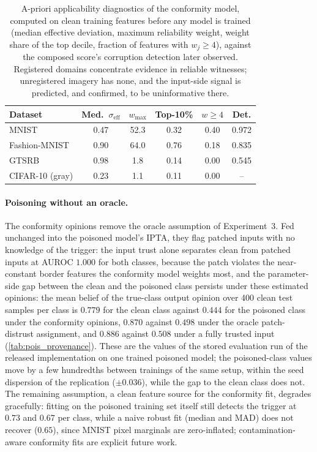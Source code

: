 \begin{table}[ht]
\centering
\begin{tabular}{lccccc}
\hline
Dataset & Med.\ $\sigma_{\mathrm{eff}}$ & $w_{\max}$ & Top-10\% & $w{\geq}4$ & Det. \\
\hline
MNIST & 0.47 & 52.3 & 0.32 & 0.40 & 0.972 \\
Fashion-MNIST & 0.90 & 64.0 & 0.76 & 0.18 & 0.835 \\
GTSRB & 0.98 & 1.8 & 0.14 & 0.00 & 0.545 \\
CIFAR-10 (gray) & 0.23 & 1.1 & 0.11 & 0.00 & -- \\
\hline
\end{tabular}
\caption{A-priori applicability diagnostics of the conformity model, computed on clean training features before any model is trained (median effective deviation, maximum reliability weight, weight share of the top decile, fraction of features with $w_j \geq 4$), against the composed score's corruption detection later observed. Registered domains concentrate evidence in reliable witnesses; unregistered imagery has none, and the input-side signal is predicted, and confirmed, to be uninformative there.}
\label{tab:diss-diagnostics}
\end{table}

\paragraph*{Poisoning without an oracle.}
The conformity opinions remove the oracle assumption of Experiment~3. Fed unchanged into the poisoned model's \ac{IPTA}, they flag patched inputs with no knowledge of the trigger: the input trust alone separates clean from patched inputs at AUROC $1.000$ for both classes, because the patch violates the near-constant border features the conformity model weights most, and the parameter-side gap between the clean and the poisoned class persists under these estimated opinions: the mean belief of the true-class output opinion over 400 clean test samples per class is $0.779$ for the clean class against $0.444$ for the poisoned class under the conformity opinions, $0.870$ against $0.498$ under the oracle patch-distrust assignment, and $0.886$ against $0.508$ under a fully trusted input (\cref{tab:pois_provenance}). These are the values of the stored evaluation run of the released implementation on one trained poisoned model; the poisoned-class values move by a few hundredths between trainings of the same setup, within the seed dispersion of the replication ($\pm 0.036$), while the gap to the clean class does not. The remaining assumption, a clean feature source for the conformity fit, degrades gracefully: fitting on the poisoned training set itself still detects the trigger at $0.73$ and $0.67$ per class, while a naive robust fit (median and MAD) does not recover ($0.65$), since MNIST pixel marginals are zero-inflated; contamination-aware conformity fits are explicit future work.


